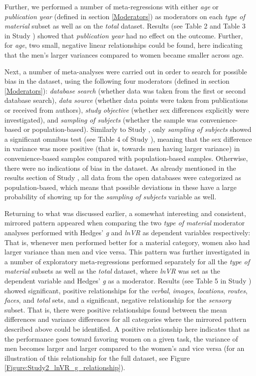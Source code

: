 Further, we performed a number of meta-regressions with either \emph{age} or \emph{publication year} (defined in section \ref{Moderators}) as moderators on each \emph{type of material} subset as well as on the \emph{total} dataset. Results (see Table 2 and Table 3 in Study ) showed that \emph{publication year} had no effect on the outcome. Further, for \emph{age}, two small, negative linear relationships could be found, here indicating that the men's larger variances compared to women became smaller across age.

Next, a number of meta-analyses were carried out in order to search for possible bias in the dataset, using the following four moderators (defined in section \ref{Moderators}): \emph{database search} (whether data was taken from the first or second database search), \emph{data source} (whether data points were taken from publications or received from authors), \emph{study objective} (whether sex differences explicitly were investigated), and \emph{sampling of subjects} (whether the sample was convenience-based or population-based). Similarly to Study , only \emph{sampling of subjects} showed a significant omnibus test (see Table 4 of Study ), meaning that the sex difference in variance was more positive (that is, towards men having larger variance) in convenience-based samples compared with population-based samples. Otherwise, there were no indications of bias in the dataset. As already mentioned in the results section of Study , all data from the open databases were categorized as population-based, which means that possible deviations in these have a large probability of showing up for the \emph{sampling of subjects} variable as well.

Returning to what was discussed earlier, a somewhat interesting and consistent, mirrored pattern appeared when comparing the two \emph{type of material} moderator analyses performed with Hedges' \emph{g} and \emph{lnVR} as dependent variables respectively: That is, whenever men performed better for a material category, women also had larger variance than men and vice versa. This pattern was further investigated in a number of exploratory meta-regressions performed separately for all the \emph{type of material} subsets as well as the \emph{total} dataset, where \emph{lnVR} was set as the dependent variable and Hedges' \emph{g} as a moderator. Results (see Table 5 in Study ) showed significant, positive relationships for the \emph{verbal}, \emph{images}, \emph{locations}, \emph{routes}, \emph{faces}, and \emph{total} sets, and a significant, negative relationship for the \emph{sensory} subset. That is, there were positive relationships found between the mean differences and variance differences for all categories where the mirrored pattern described above could be identified. A positive relationship here indicates that as the performance goes toward favoring women on a given task, the variance of men becomes larger and larger compared to the women's and vice versa (for an illustration of this relationship for the full dataset, see Figure \ref{Figure:Study2_lnVR_g_relationship}).

